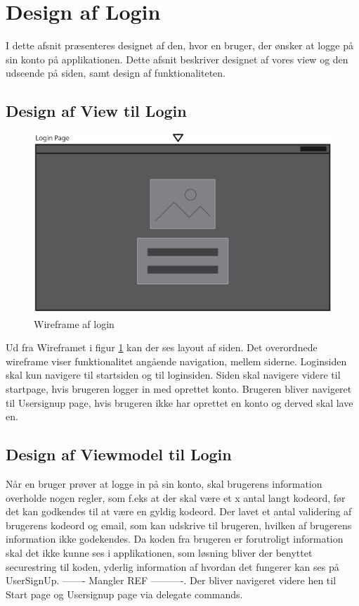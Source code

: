 \documentclass[SoftwareDesign/SoftwareDesign_main.tex]{subfiles}
\begin{document}
\section{Design af Login}
I dette afsnit præsenteres designet af den, hvor en bruger, der ønsker at logge på sin konto på applikationen. Dette afsnit beskriver designet af vores view og den udseende på siden, samt design af funktionaliteten.

\subsection{Design af View til Login}

\begin{figure}[H]
    \centering
    \includegraphics[width=\textwidth]{SoftwareDesign/MVVMDesigns/Graphics/LoginWireframe.png}
    \caption{Wireframe af login}
    \label{fig:LoginWireframe}
\end{figure}

Ud fra Wireframet i figur \ref{fig:LoginWireframe} kan der ses layout af siden. Det overordnede wireframe viser funktionalitet angående navigation, mellem siderne. Loginsiden skal kun navigere til startsiden og til loginsiden. Siden skal navigere videre til startpage, hvis brugeren logger in med oprettet konto. Brugeren bliver navigeret til Usersignup page, hvis brugeren ikke har oprettet en konto og derved skal lave en. 


\subsection{Design af Viewmodel til Login}
Når en bruger prøver at logge in på sin konto, skal brugerens information overholde nogen regler, som f.eks at der skal være et x antal langt kodeord, før det kan godkendes til at være en gyldig kodeord. Der lavet et antal validering af brugerens kodeord og email, som kan udskrive til brugeren, hvilken af brugerens information ikke godekendes. Da koden fra brugeren er forutroligt information skal det ikke kunne ses i applikationen, som løsning bliver der benyttet securestring til koden, yderlig information af hvordan det fungerer kan ses på UserSignUp. ------- Mangler REF ----------. Der bliver navigeret videre hen til Start page og Usersignup page via delegate commands.    
\end{document}
